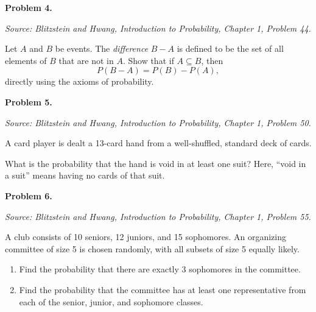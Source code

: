\documentclass[11pt]{article}
\newcommand{\source}[1]{%
    \vspace{0.15cm}
    {\small\textit{Source: Blitzstein and Hwang, \textit{Introduction to Probability}, Chapter 1, Problem #1.}}
}
\begin{document}
\vfill
 
 \newpage


\begin{problemheader}
\textbf{Problem 4. }
\end{problemheader}
\source{44}

Let $A$ and $B$ be events. The \emph{difference} $B-A$ is defined to be the set of all elements of $B$ that are not in $A$. Show that if $A\subseteq B$, then
\[
P(B-A)=P(B)-P(A),
\]
directly using the axioms of probability.

\vfill
 
 \newpage


\begin{problemheader}
\textbf{Problem 5. }
\end{problemheader}
\source{50}

A card player is dealt a 13-card hand from a well-shuffled, standard deck of cards.

What is the probability that the hand is void in at least one suit? Here, ``void in a suit'' means having no cards of that suit.

\vfill
 \newpage


\begin{problemheader}
\textbf{Problem 6.}
\end{problemheader}
\source{55}

A club consists of 10 seniors, 12 juniors, and 15 sophomores. An organizing committee of size 5 is chosen randomly, with all subsets of size 5 equally likely.

\begin{enumerate}[label=(\alph*), leftmargin=*]
    \item Find the probability that there are exactly 3 sophomores in the committee.

    \item Find the probability that the committee has at least one representative from each of the senior, junior, and sophomore classes.
\end{enumerate}

\vfill
 
\end{document}
